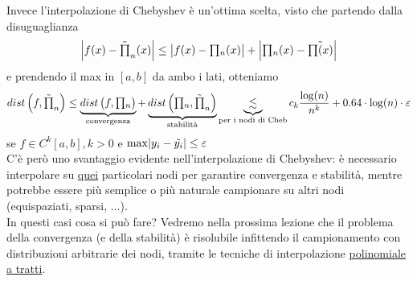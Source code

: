 Invece l'interpolazione di Chebyshev è un'ottima scelta, visto che partendo dalla disuguaglianza
\[ \abs*{f(x) - \tilde{\inter}_n (x)} \leq \abs*{f(x) - \inter_n (x)} + \abs*{\inter_n (x) - \tilde{\inter (x)}} \]
e prendendo il max in $[a,b]$ da ambo i lati, otteniamo
\[ dist\left(f, \tilde{\inter}_n\right) \leq \underbrace{dist \left(f, \inter_n \right)}_{\text{convergenza}} + \underbrace{dist \left( \inter_n, \tilde{\inter}_n\right)}_{\text{stabilità}} \underbrace{\lesssim}_{\text{per i nodi di Cheb}} c_k \frac{\log(n)}{n^k} + 0.64\cdot \log(n) \cdot \varepsilon \]
se $f \in C^k [a,b], k>0$ e $\max\abs{y_i - \tilde{y_i}} \leq \varepsilon$\\
C'è però uno svantaggio evidente nell'interpolazione di Chebyshev: è necessario interpolare su \uline{quei} particolari nodi per garantire convergenza e stabilità, mentre potrebbe essere più semplice o più naturale campionare su altri nodi (equispaziati, sparsi, $\dotso$).\\
In questi casi cosa si può fare? Vedremo nella prossima lezione che il problema della convergenza (e della stabilità) è risolubile infittendo il campionamento con distribuzioni arbitrarie dei nodi, tramite le tecniche di interpolazione \uline{polinomiale a tratti}.
\newpage
